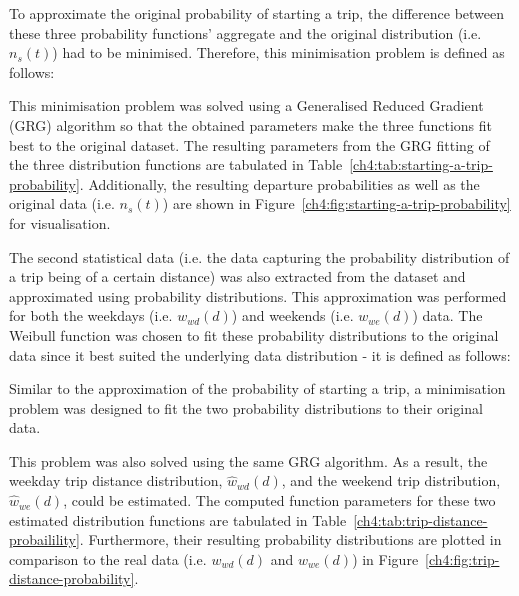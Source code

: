 To approximate the original probability of starting a trip, the difference between these three probability functions' aggregate and the original distribution (i.e. $n_s(t)$) had to be minimised.
Therefore, this minimisation problem is defined as follows:



This minimisation problem was solved using a Generalised Reduced Gradient (GRG) algorithm so that the obtained parameters make the three functions fit best to the original dataset.
The resulting parameters from the GRG fitting of the three distribution functions are tabulated in Table~\ref{ch4:tab:starting-a-trip-probability}.
Additionally, the resulting departure probabilities as well as the original data (i.e. $n_s(t)$) are shown in Figure~\ref{ch4:fig:starting-a-trip-probability} for visualisation.





The second statistical data (i.e. the data capturing the probability distribution of a trip being of a certain distance) was also extracted from the dataset and approximated using probability distributions.
This approximation was performed for both the weekdays (i.e. $w_{wd}(d)$) and weekends (i.e. $w_{we}(d)$) data.
The Weibull function was chosen to fit these probability distributions to the original data since it best suited the underlying data distribution - it is defined as follows:



Similar to the approximation of the probability of starting a trip, a minimisation problem was designed to fit the two probability distributions to their original data.



This problem was also solved using the same GRG algorithm.
As a result, the weekday trip distance distribution, $\hat{w}_{wd}(d)$, and the weekend trip distribution, $\hat{w}_{we}(d)$, could be estimated.
The computed function parameters for these two estimated distribution functions are tabulated in Table~\ref{ch4:tab:trip-distance-probailility}.
Furthermore, their resulting probability distributions are plotted in comparison to the real data (i.e. $w_{wd}(d)$ and $w_{we}(d)$) in Figure~\ref{ch4:fig:trip-distance-probability}.

